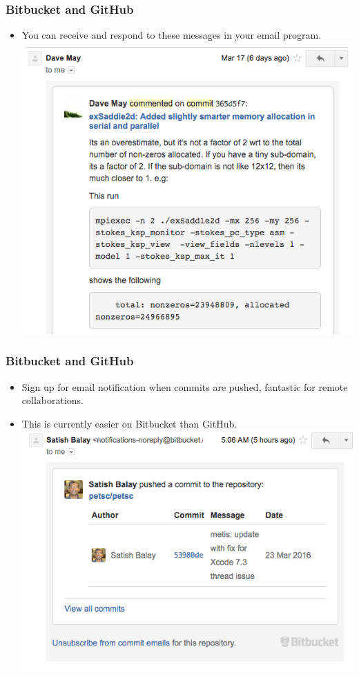 \documentclass{beamer}
\begin{document}
\begin{frame}[fragile]
\frametitle{Bitbucket and GitHub}
\begin{itemize}
\item You can receive and respond to these messages in your email program.\\
\includegraphics[scale=0.3]{bitbucket5}
\end{itemize}
\end{frame}

\begin{frame}[fragile]
\frametitle{Bitbucket and GitHub}
\begin{itemize}
\item Sign up for email notification when commits are pushed, fantastic for remote collaborations.
\item This is currently easier on Bitbucket than GitHub.\\
\includegraphics[scale=0.3]{bitbucket4}
\end{itemize}
\end{frame}
\end{document}
